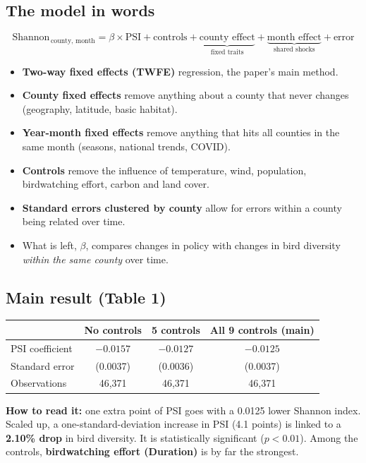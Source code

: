 \documentclass[11pt]{article}
\begin{document}
\subsection{The model in words}
\[
\text{Shannon}_{\,\text{county, month}} = \beta \times \text{PSI} + \text{controls} + \underbrace{\text{county effect}}_{\text{fixed traits}} + \underbrace{\text{month effect}}_{\text{shared shocks}} + \text{error}
\]
\begin{itemize}
\item \textbf{Two-way fixed effects (TWFE)} regression, the paper's main method.
\item \textbf{County fixed effects} remove anything about a county that never changes (geography, latitude, basic habitat).
\item \textbf{Year-month fixed effects} remove anything that hits all counties in the same month (seasons, national trends, COVID).
\item \textbf{Controls} remove the influence of temperature, wind, population, birdwatching effort, carbon and land cover.
\item \textbf{Standard errors clustered by county} allow for errors within a county being related over time.
\item What is left, $\beta$, compares changes in policy with changes in bird diversity \emph{within the same county} over time.
\end{itemize}

\subsection{Main result (Table 1)}
\begin{table}[H]\centering\small
\begin{tabular}{lccc}
\toprule
& No controls & 5 controls & All 9 controls (main)\\
\midrule
PSI coefficient & $-0.0157$ & $-0.0127$ & $\mathbf{-0.0125}$\\
Standard error & (0.0037) & (0.0036) & (0.0037)\\
Observations & 46,371 & 46,371 & 46,371\\
\bottomrule
\end{tabular}
\end{table}
\textbf{How to read it:} one extra point of PSI goes with a 0.0125 lower Shannon index. Scaled up, a one-standard-deviation increase in PSI (4.1 points) is linked to a \textbf{2.10\% drop} in bird diversity. It is statistically significant ($p<0.01$). Among the controls, \textbf{birdwatching effort (Duration)} is by far the strongest.
\end{document}
